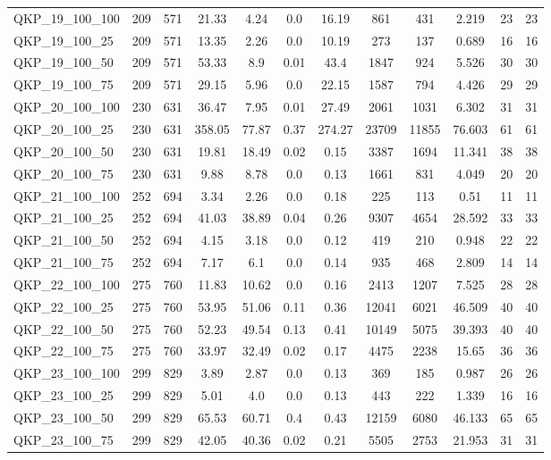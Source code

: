 \begin{table}[!h]
{\begin{tabular}{lccccccccccc}
QKP\_19\_100\_100 & 209 & 571 & 21.33 & 4.24 & 0.0 & 16.19 & 861 & 431 & 2.219 & 23 & 23\\
QKP\_19\_100\_25 & 209 & 571 & 13.35 & 2.26 & 0.0 & 10.19 & 273 & 137 & 0.689 & 16 & 16\\
QKP\_19\_100\_50 & 209 & 571 & 53.33 & 8.9 & 0.01 & 43.4 & 1847 & 924 & 5.526 & 30 & 30\\
QKP\_19\_100\_75 & 209 & 571 & 29.15 & 5.96 & 0.0 & 22.15 & 1587 & 794 & 4.426 & 29 & 29\\
QKP\_20\_100\_100 & 230 & 631 & 36.47 & 7.95 & 0.01 & 27.49 & 2061 & 1031 & 6.302 & 31 & 31\\
QKP\_20\_100\_25 & 230 & 631 & 358.05 & 77.87 & 0.37 & 274.27 & 23709 & 11855 & 76.603 & 61 & 61\\
QKP\_20\_100\_50 & 230 & 631 & 19.81 & 18.49 & 0.02 & 0.15 & 3387 & 1694 & 11.341 & 38 & 38\\
QKP\_20\_100\_75 & 230 & 631 & 9.88 & 8.78 & 0.0 & 0.13 & 1661 & 831 & 4.049 & 20 & 20\\
QKP\_21\_100\_100 & 252 & 694 & 3.34 & 2.26 & 0.0 & 0.18 & 225 & 113 & 0.51 & 11 & 11\\
QKP\_21\_100\_25 & 252 & 694 & 41.03 & 38.89 & 0.04 & 0.26 & 9307 & 4654 & 28.592 & 33 & 33\\
QKP\_21\_100\_50 & 252 & 694 & 4.15 & 3.18 & 0.0 & 0.12 & 419 & 210 & 0.948 & 22 & 22\\
QKP\_21\_100\_75 & 252 & 694 & 7.17 & 6.1 & 0.0 & 0.14 & 935 & 468 & 2.809 & 14 & 14\\
QKP\_22\_100\_100 & 275 & 760 & 11.83 & 10.62 & 0.0 & 0.16 & 2413 & 1207 & 7.525 & 28 & 28\\
QKP\_22\_100\_25 & 275 & 760 & 53.95 & 51.06 & 0.11 & 0.36 & 12041 & 6021 & 46.509 & 40 & 40\\
QKP\_22\_100\_50 & 275 & 760 & 52.23 & 49.54 & 0.13 & 0.41 & 10149 & 5075 & 39.393 & 40 & 40\\
QKP\_22\_100\_75 & 275 & 760 & 33.97 & 32.49 & 0.02 & 0.17 & 4475 & 2238 & 15.65 & 36 & 36\\
QKP\_23\_100\_100 & 299 & 829 & 3.89 & 2.87 & 0.0 & 0.13 & 369 & 185 & 0.987 & 26 & 26\\
QKP\_23\_100\_25 & 299 & 829 & 5.01 & 4.0 & 0.0 & 0.13 & 443 & 222 & 1.339 & 16 & 16\\
QKP\_23\_100\_50 & 299 & 829 & 65.53 & 60.71 & 0.4 & 0.43 & 12159 & 6080 & 46.133 & 65 & 65\\
QKP\_23\_100\_75 & 299 & 829 & 42.05 & 40.36 & 0.02 & 0.21 & 5505 & 2753 & 21.953 & 31 & 31\\

\end{tabular}}
\end{table}
